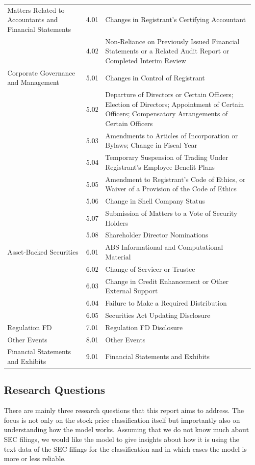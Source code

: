 \documentclass{article}
\begin{document}
\begin{table}[h!]
\begin{tabularx}{\textwidth}{|X|l|X|}
		Matters Related to Accountants and Financial Statements & 4.01 & Changes in Registrant's Certifying Accountant \\
		& 4.02 & Non-Reliance on Previously Issued Financial Statements or a Related Audit Report or Completed Interim Review \\
		Corporate Governance and Management & 5.01 & Changes in Control of Registrant \\
		& 5.02 & Departure of Directors or Certain Officers; Election of Directors; Appointment of Certain Officers; Compensatory Arrangements of Certain Officers \\
		& 5.03 & Amendments to Articles of Incorporation or Bylaws; Change in Fiscal Year \\
		& 5.04 & Temporary Suspension of Trading Under Registrant's Employee Benefit Plans \\
		& 5.05 & Amendment to Registrant's Code of Ethics, or Waiver of a Provision of the Code of Ethics \\
		& 5.06 & Change in Shell Company Status \\
		& 5.07 & Submission of Matters to a Vote of Security Holders \\
		& 5.08 & Shareholder Director Nominations \\
		Asset-Backed Securities & 6.01 & ABS Informational and Computational Material \\
		& 6.02 & Change of Servicer or Trustee \\
		& 6.03 & Change in Credit Enhancement or Other External Support \\
		& 6.04 & Failure to Make a Required Distribution \\
		& 6.05 & Securities Act Updating Disclosure \\
		Regulation FD & 7.01 & Regulation FD Disclosure \\
		Other Events & 8.01 & Other Events \\
		Financial Statements and Exhibits & 9.01 & Financial Statements and Exhibits \\
		\bottomrule
	\end{tabularx}

	\end{table}%


	\subsection{Research Questions}
	
	There are mainly three research questions that this report aims to address. The focus is not only on the stock price classification itself but importantly also on understanding how the model works. Assuming that we do not know much about SEC filings, we would like the model to give insights about how it is using the text data of the SEC filings for the classification and in which cases the model is more or less reliable. 
	
\end{document}

